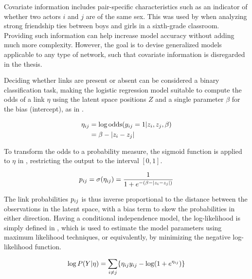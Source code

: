     Covariate information includes pair-specific characteristics such as an indicator of whether two actors $i$ and $j$ are of the same sex. This was used by \citeauthor*{hoff2002latent} when analyzing strong friendship ties between boys and girls in a sixth-grade classroom. Providing such information can help increase model accuracy without adding much more complexity. However, the goal is to devise generalized models applicable to any type of network, such that covariate information is disregarded in the thesis. 
    
    Deciding whether links are present or absent can be considered a binary classification task, making the logistic regression model suitable to compute the odds of a link $\eta$ using the latent space positions $Z$ and a single parameter $\beta$ for the bias (intercept), as in .
    
    \begin{equation}\label{eq:lsm-link-odds}
        \begin{split}
            \sub(\eta) &= \log \odds(\sub(y)=1|z_i,z_j,\beta) \\
                       &= \beta - |z_i-z_j|
        \end{split}
    \end{equation}
    
    To transform the odds to a probability measure, the sigmoid function is applied to $\eta$ in , restricting the output to the interval $[0,1]$.
    
    \begin{equation}\label{eq:lsm-link-sigmoid}
        \sub(p) = \sigma(\sub(\eta)) = \frac{1}{1 + e^{-(\beta - |z_i-z_j|)}}
    \end{equation}
    
    The link probabilities $\sub(p)$ is thus inverse proportional to the distance between the observations in the latent space, with a bias term to skew the probabilities in either direction.
    Having a conditional independence model, the log-likelihood is simply defined in , which is used to estimate the model parameters using maximum likelihood techniques, or equivalently, by minimizing the negative log-likelihood function.
    
    \begin{equation}\label{eq:lsm-log-likelihood}
        \log P(Y|\eta) = \sum_{i\neq j}\{ \sub(\eta)\sub(y) - \log(1+e^{\sub(\eta)}) \}
    \end{equation}
    
